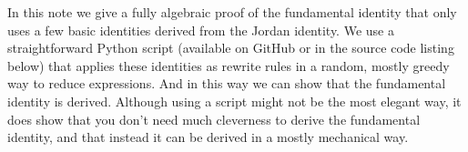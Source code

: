 \documentclass{article}
\begin{document}
In this note we give a fully algebraic proof of the fundamental identity that only uses a few basic identities derived from the Jordan identity. We use a straightforward Python script (available on GitHub \cite{sourcecode} or in the source code listing below) that applies these identities as rewrite rules in a random, mostly greedy way to reduce expressions. And in this way we can show that the fundamental identity is derived. Although using a script might not be the most elegant way, it does show that you don't need much cleverness to derive the fundamental identity, and that instead it can be derived in a mostly mechanical way.

\end{document}
